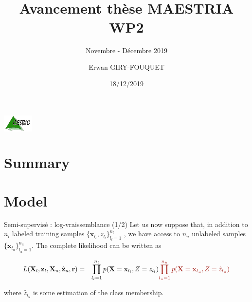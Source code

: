 \documentclass[aspectratio=1610,usenames,dvipsnames]{beamer}
\title{Avancement thèse MAESTRIA WP2}
\subtitle{Novembre - Décembre 2019}
\author{Erwan GIRY-FOUQUET}
\institute{CESBIO, Toulouse}
\date{18/12/2019}
\begin{document}
{
\begin{frame}
\vspace{.8cm}
\includegraphics[width=1.5cm]{logo_cesbio_transp.pdf}
\titlepage %
\end{frame}
}


\section*{Summary}
\begin{frame}
  \tableofcontents
\end{frame}  

\section{Model}

\begin{frame}{Semi-supervisé : log-vraissemblance (1/2)}
    Let us now suppose that, in addition to \(n_l\) labeled training samples \(\big\{\mathbf{x}_{l_l},   z_{l_l}\big\}_{l_l=1}^{n_l}\) , we have access to \(n_u\) unlabeled samples \(\big\{\mathbf{x}_{l_u}\big\}_{l_u=1}^{n_u}\). The complete likelihood can be written as

    \begin{eqnarray*}
      L(\mathbf{X}_l, \mathbf{z}_l, \mathbf{X}_u, \hat{\mathbf{z}}_u, \mathbf{r}) &=& \prod_{l_l=1}^{n_l}
      p(\mathbf{X}=\mathbf{x}_{l_l}, Z=z_{l_l}) 
      \color{Mahogany}{
      \prod_{l_u=1}^{n_u} p(\mathbf{X}=\mathbf{x}_{l_u}, Z=\hat{z}_{l_u})
      }\\
    \end{eqnarray*}
    
    
    where \(\hat{z}_{l_u}\) is some estimation of the class membership.

\end{frame}

\end{document}
